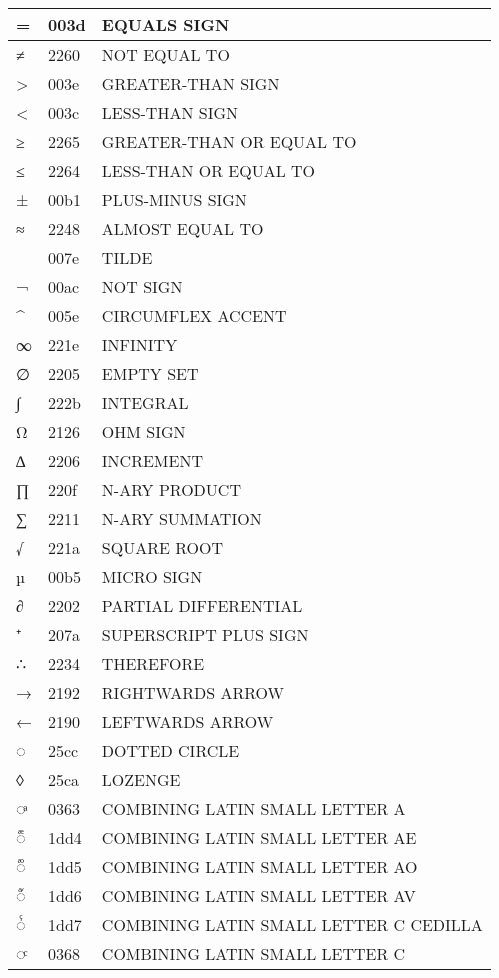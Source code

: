 \documentclass[12pt,letterpaper,openany]{book}
\begin{document}
\begin{center}
\begin{supertabular}{|m{0.25in}|m{0.5in}|m{4in}|}
= & 003d & EQUALS SIGN\\\hline
≠ & 2260 & NOT EQUAL TO\\\hline
> & 003e & GREATER-THAN SIGN\\\hline
< & 003c & LESS-THAN SIGN\\\hline
≥ & 2265 & GREATER-THAN OR EQUAL TO\\\hline
≤ & 2264 & LESS-THAN OR EQUAL TO\\\hline
± & 00b1 & PLUS-MINUS SIGN\\\hline
≈ & 2248 & ALMOST EQUAL TO\\\hline
~ & 007e & TILDE\\\hline
¬ & 00ac & NOT SIGN\\\hline
\^ & 005e & CIRCUMFLEX ACCENT\\\hline
∞ & 221e & INFINITY\\\hline
∅ & 2205 & EMPTY SET\\\hline
∫ & 222b & INTEGRAL\\\hline
Ω & 2126 & OHM SIGN\\\hline
∆ & 2206 & INCREMENT\\\hline
∏ & 220f & N-ARY PRODUCT\\\hline
∑ & 2211 & N-ARY SUMMATION\\\hline
√ & 221a & SQUARE ROOT\\\hline
µ & 00b5 & MICRO SIGN\\\hline
∂ & 2202 & PARTIAL DIFFERENTIAL\\\hline
⁺ & 207a & SUPERSCRIPT PLUS SIGN\\\hline
∴ & 2234 & THEREFORE\\\hline
→ & 2192 & RIGHTWARDS ARROW\\\hline
← & 2190 & LEFTWARDS ARROW\\\hline
◌ & 25cc & DOTTED CIRCLE\\\hline
◊ & 25ca & LOZENGE\\\hline
◌ͣ & 0363 & COMBINING LATIN SMALL LETTER A\\\hline
◌ᷔ & 1dd4 & COMBINING LATIN SMALL LETTER AE\\\hline
◌ᷕ & 1dd5 & COMBINING LATIN SMALL LETTER AO\\\hline
◌ᷖ & 1dd6 & COMBINING LATIN SMALL LETTER AV\\\hline
◌ᷗ & 1dd7 & COMBINING LATIN SMALL LETTER C CEDILLA\\\hline
◌ͨ & 0368 & COMBINING LATIN SMALL LETTER C\\\hline

\end{supertabular}
\end{center}
\end{document}
